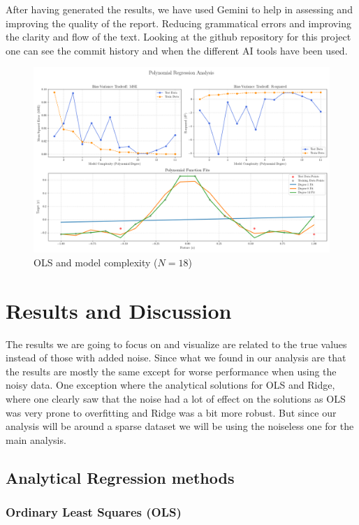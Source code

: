 \documentclass[twocolumn,aps]{revtex4}
\begin{document}
After having generated the results, we have used Gemini to help in assessing and improving the quality of the report.
Reducing grammatical errors and improving the clarity and flow of the text.
Looking at the github repository for this project one can see the commit history and when the different AI tools have been used.
\begin{figure}[t]
    \centering  
    \includegraphics[width=.95 \linewidth]{Figures/Combined_Analysis_OLS.png}
    \caption{OLS and model complexity ($N=18$)}
    \label{fig:OLS1}
\end{figure}
\section{Results and Discussion}\label{section:results}
The results we are going to focus on and visualize are related to the true values instead of those with added noise. 
Since what we found in our analysis are that the results are mostly the same except for worse performance when using the noisy data.
One exception where the analytical solutions for OLS and Ridge, where one clearly saw that the noise had a lot of effect on the solutions as OLS was very prone to overfitting and Ridge was a bit more robust.
But since our analysis will be around a sparse dataset we will be using the noiseless one for the main analysis.

\subsection{Analytical Regression methods}

\subsubsection{Ordinary Least Squares (OLS)}
\end{document}
